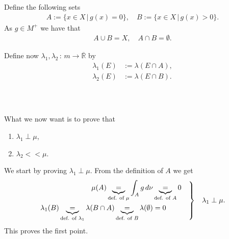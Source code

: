\documentclass{beamer}
\newenvironment{rcases}{\left.\begin{aligned}}{\end{aligned}\right\rbrace}
\numberwithin{equation}{section}
\begin{document}
\begin{frame}\frametitle{{\normalsize \secname} \\ {\large \subsecname}}
    Define the following sets
    \begin{align}
        A := \{ x \in X \, | \, g(x) = 0 \}, \quad B := \{x \in X \,|\, g(x) > 0 \}.
    \end{align}
    As $g \in M^+$ we have that
    \begin{align}
        A \cup B = X, \quad A \cap B = \emptyset.
    \end{align}
    \vspace{1em}

    Define now $\lambda_1, \lambda_2 \, : \, m \longrightarrow \overline{\mathbb{R}}$ by
    \begin{align}
        \lambda_1(E) &:= \lambda(E \cap A), \\
        \lambda_2(E) &:= \lambda(E \cap B).
    \end{align}
\end{frame}

\begin{frame}\frametitle{{\normalsize \secname} \\ {\large \subsecname}}
    What we now want is to prove that 
    \begin{enumerate}
        \item $\lambda_1 \perp \mu$,
        \item $\lambda_2 << \mu$.
    \end{enumerate}
    \vspace{1em}

    We start by proving $\lambda_1 \perp \mu$.
    From the definition of $A$ we get
    \begin{align}
        \begin{rcases}
        \mu (A) \underbrace{=}_{\text{def. of $\mu$}} \int_A g \, d\nu &\underbrace{=}_{\text{def. of $A$}} 0 \quad\\
        \lambda_1(B) \underbrace{=}_{\text{def. of $\lambda_1$}} \lambda(B \cap A) \underbrace{=}_{\text{def. of $B$}} \lambda(\emptyset) &= 0
        \end{rcases}
        \quad
        \lambda_1 \perp \mu.
    \end{align}
    This proves the first point.
\end{frame}
\end{document}

